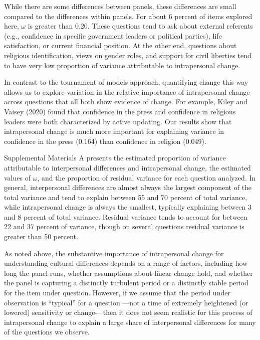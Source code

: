 \documentclass[
  12pt,
]{article}
\begin{document}
While there are some differences between panels, these differences are
small compared to the differences within panels. For about 6 percent of
items explored here, \(\omega\) is greater than 0.20. These questions
tend to ask about external referents (e.g., confidence in specific
government leaders or political parties), life satisfaction, or current
financial position. At the other end, questions about religious
identification, views on gender roles, and support for civil liberties
tend to have very low proportion of variance attributable to
intrapersonal change.

In contrast to the tournament of models approach, quantifying change
this way allows us to explore variation in the relative importance of
intrapersonal change across questions that all both show evidence of
change. For example, Kiley and Vaisey (2020) found that confidence in
the press and confidence in religious leaders were both characterized by
active updating. Our results show that intrapersonal change is much more
important for explaining variance in confidence in the press (0.164)
than confidence in religion (0.049).

Supplemental Materials A presents the estimated proportion of variance
attributable to interpersonal differences and intrapersonal change, the
estimated values of \(\omega\), and the proportion of residual variance
for each question analyzed. In general, interpersonal differences are
almost always the largest component of the total variance and tend to
explain between 55 and 70 percent of total variance, while intrapersonal
change is always the smallest, typically explaining between 3 and 8
percent of total variance. Residual variance tends to account for
between 22 and 37 percent of variance, though on several questions
residual variance is greater than 50 percent.

As noted above, the substantive importance of intrapersonal change for
understanding cultural differences depends on a range of factors,
including how long the panel runs, whether assumptions about linear
change hold, and whether the panel is capturing a distinctly turbulent
period or a distinctly stable period for the item under question.
However, if we assume that the period under observation is ``typical''
for a question ---not a time of extremely heightened (or lowered)
sensitivity or change-\/-- then it does not seem realistic for this
process of intrapersonal change to explain a large share of
interpersonal differences for many of the questions we observe.
\end{document}
